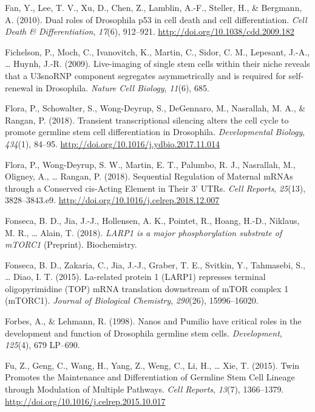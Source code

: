 \documentclass[12pt,twoside]{reedthesis}
\newlength{\cslhangindent}
\newenvironment{cslreferences}%
  {\setlength{\parindent}{0pt}%
  \everypar{\setlength{\hangindent}{\cslhangindent}}\ignorespaces}%
  {\par}
\begin{document}
\begin{cslreferences}
\leavevmode\hypertarget{ref-fanDualRolesDrosophila2010}{}%
Fan, Y., Lee, T. V., Xu, D., Chen, Z., Lamblin, A.-F., Steller, H., \& Bergmann, A. (2010). Dual roles of Drosophila p53 in cell death and cell differentiation. \emph{Cell Death \& Differentiation}, \emph{17}(6), 912--921. \url{http://doi.org/10.1038/cdd.2009.182}

\leavevmode\hypertarget{ref-Fichelson2009a}{}%
Fichelson, P., Moch, C., Ivanovitch, K., Martin, C., Sidor, C. M., Lepesant, J.-A., \ldots{} Huynh, J.-R. (2009). Live-imaging of single stem cells within their niche reveals that a U3snoRNP component segregates asymmetrically and is required for self-renewal in Drosophila. \emph{Nature Cell Biology}, \emph{11}(6), 685.

\leavevmode\hypertarget{ref-Flora2018l}{}%
Flora, P., Schowalter, S., Wong-Deyrup, S., DeGennaro, M., Nasrallah, M. A., \& Rangan, P. (2018). Transient transcriptional silencing alters the cell cycle to promote germline stem cell differentiation in Drosophila. \emph{Developmental Biology}, \emph{434}(1), 84--95. \url{http://doi.org/10.1016/j.ydbio.2017.11.014}

\leavevmode\hypertarget{ref-Flora2018k}{}%
Flora, P., Wong-Deyrup, S. W., Martin, E. T., Palumbo, R. J., Nasrallah, M., Oligney, A., \ldots{} Rangan, P. (2018). Sequential Regulation of Maternal mRNAs through a Conserved cis-Acting Element in Their 3' UTRs. \emph{Cell Reports}, \emph{25}(13), 3828--3843.e9. \url{http://doi.org/10.1016/j.celrep.2018.12.007}

\leavevmode\hypertarget{ref-fonsecaLARP1MajorPhosphorylation2018}{}%
Fonseca, B. D., Jia, J.-J., Hollensen, A. K., Pointet, R., Hoang, H.-D., Niklaus, M. R., \ldots{} Alain, T. (2018). \emph{LARP1 is a major phosphorylation substrate of mTORC1} (Preprint). Biochemistry.

\leavevmode\hypertarget{ref-Fonseca2015a}{}%
Fonseca, B. D., Zakaria, C., Jia, J.-J., Graber, T. E., Svitkin, Y., Tahmasebi, S., \ldots{} Diao, I. T. (2015). La-related protein 1 (LARP1) represses terminal oligopyrimidine (TOP) mRNA translation downstream of mTOR complex 1 (mTORC1). \emph{Journal of Biological Chemistry}, \emph{290}(26), 15996--16020.

\leavevmode\hypertarget{ref-Forbes1998g}{}%
Forbes, A., \& Lehmann, R. (1998). Nanos and Pumilio have critical roles in the development and function of Drosophila germline stem cells. \emph{Development}, \emph{125}(4), 679 LP--690.

\leavevmode\hypertarget{ref-Fu2015h}{}%
Fu, Z., Geng, C., Wang, H., Yang, Z., Weng, C., Li, H., \ldots{} Xie, T. (2015). Twin Promotes the Maintenance and Differentiation of Germline Stem Cell Lineage through Modulation of Multiple Pathways. \emph{Cell Reports}, \emph{13}(7), 1366--1379. \url{http://doi.org/10.1016/j.celrep.2015.10.017}


\end{cslreferences}
\end{document}
